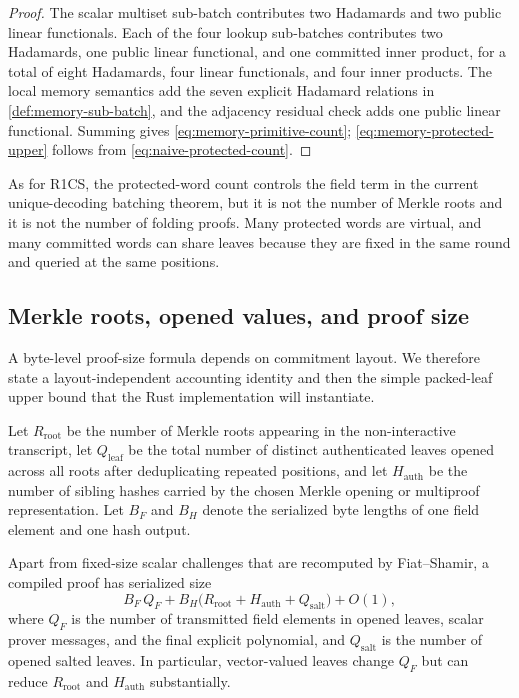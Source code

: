 \begin{proof}
The scalar multiset sub-batch contributes two Hadamards and two public linear functionals.  Each of the four lookup sub-batches contributes two Hadamards, one public linear functional, and one committed inner product, for a total of eight Hadamards, four linear functionals, and four inner products.  The local memory semantics add the seven explicit Hadamard relations in \cref{def:memory-sub-batch}, and the adjacency residual check adds one public linear functional.  Summing gives \eqref{eq:memory-primitive-count}; \eqref{eq:memory-protected-upper} follows from \eqref{eq:naive-protected-count}.
\end{proof}

As for R1CS, the protected-word count controls the field term in the current unique-decoding batching theorem, but it is not the number of Merkle roots and it is not the number of folding proofs.  Many protected words are virtual, and many committed words can share leaves because they are fixed in the same round and queried at the same positions.

\subsection{Merkle roots, opened values, and proof size}
\label{sec:complexity-proof-size}

A byte-level proof-size formula depends on commitment layout.  We therefore state a layout-independent accounting identity and then the simple packed-leaf upper bound that the Rust implementation will instantiate.

Let $R_{\mathrm{root}}$ be the number of Merkle roots appearing in the non-interactive transcript, let $Q_{\mathrm{leaf}}$ be the total number of distinct authenticated leaves opened across all roots after deduplicating repeated positions, and let $H_{\mathrm{auth}}$ be the number of sibling hashes carried by the chosen Merkle opening or multiproof representation.  Let $B_F$ and $B_H$ denote the serialized byte lengths of one field element and one hash output.

\begin{proposition}
\label{prop:generic-proof-size}
Apart from fixed-size scalar challenges that are recomputed by Fiat--Shamir, a compiled proof has serialized size
\begin{equation}
  B_F\,Q_F
  +B_H\bigl(R_{\mathrm{root}}+H_{\mathrm{auth}}+Q_{\mathrm{salt}}\bigr)
  +O(1),
  \label{eq:proof-size-accounting}
\end{equation}
where $Q_F$ is the number of transmitted field elements in opened leaves, scalar prover messages, and the final explicit polynomial, and $Q_{\mathrm{salt}}$ is the number of opened salted leaves.  In particular, vector-valued leaves change $Q_F$ but can reduce $R_{\mathrm{root}}$ and $H_{\mathrm{auth}}$ substantially.
\end{proposition}

